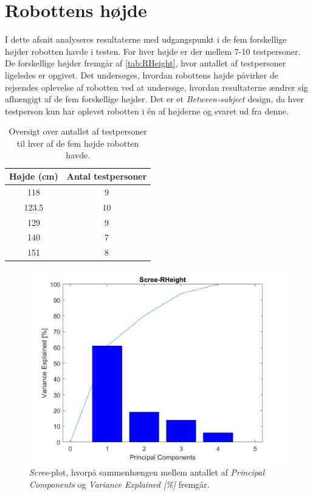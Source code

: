 \section{Robottens højde}
\label{DatabehandlingRHeight}
%
I dette afsnit analyseres resultaterne med udgangspunkt i de fem forskellige højder robotten havde i testen. For hver højde er der mellem 7-10 testpersoner. De forskellige højder fremgår af \autoref{tab:RHeight}, hvor antallet af testpersoner ligeledes er opgivet. Det undersøges, hvordan robottens højde påvirker de rejsendes oplevelse af robotten ved at undersøge, hvordan resultaterne ændrer sig afhængigt af de fem forskellige højder. Det er et \textit{Between-subject} design, da hver testperson kun har oplevet robotten i én af højderne og svaret ud fra denne.
%
\begin{table}[H]
\centering
\begin{tabular}{c|c}
Højde (cm) & Antal testpersoner \\ \hline
118   & 9     \\ \hline
123.5 & 10    \\ \hline
129   & 9     \\ \hline
140   & 7     \\ \hline
151   & 8      \\
\end{tabular}
\caption{Oversigt over antallet af testpersoner til hver af de fem højde robotten havde.}
\label{tab:RHeight}
\end{table}
\noindent
%
%
\begin{figure}[H]
\centering
\includegraphics[width=\textwidth]{Figure/DatabehandlingSkalaer/PCAfigures/RHeight-Scree.png}
\caption{\textit{Scree}-plot, hvorpå sammenhængen mellem antallet af \textit{Principal Components} og \textit{Variance Explained [\%]} fremgår.}
\label{fig:RHeight-Scree}
\end{figure}
